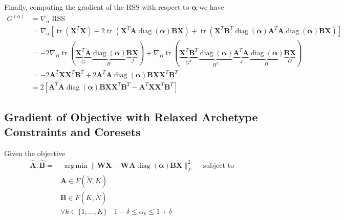 \documentclass[oneside]{article}
\DeclareMathOperator*{\argmin}{arg\,min}
\begin{document}
Finally, computing the gradient of the RSS with respect to $\boldsymbol{\alpha}$ we have
\begin{equation}
    \label{eq:relaxed_objective_grad_alpha}
    \begin{aligned}
        G^{(\alpha)} &= \nabla_{\alpha} \operatorname{RSS} \\
        &= \nabla_{\alpha}
        \left[
            \operatorname{tr}\left( \mathbf{X}^T \mathbf{X} \right)
            - 2 \operatorname{tr} \left( \mathbf{{X}}^T \mathbf{{A}} \operatorname{diag}(\boldsymbol{\alpha}) \mathbf{B} \mathbf{X} \right)
            + \operatorname{tr} \left( \mathbf{X}^T \mathbf{B}^T \operatorname{diag}(\boldsymbol{\alpha}) \mathbf{{A}}^T \mathbf{{A}} \operatorname{diag}(\boldsymbol{\alpha}) \mathbf{B} \mathbf{X} \right)
        \right] \\
        &=
            - 2 \nabla_B \operatorname{tr}(\underbrace{\mathbf{{X}}^T \mathbf{{A}}}_{G} \underbrace{\operatorname{diag}(\boldsymbol{\alpha})}_{H} \underbrace{\mathbf{B} \mathbf{X}}_{J})
            + \nabla_B \operatorname{tr}(\underbrace{\mathbf{X}^T \mathbf{B}^T }_{G^T} \underbrace{\operatorname{diag}(\boldsymbol{\alpha})}_{H^T} \underbrace{\mathbf{{A}}^T \mathbf{{A}}}_{J} \underbrace{\operatorname{diag}(\boldsymbol{\alpha})}_{H} \underbrace{\mathbf{B} \mathbf{X}}_{G}) \\
        & =
            -2 \mathbf{{A}}^T \mathbf{{X}} \mathbf{X}^T \mathbf{B}^T
            +2 \mathbf{{A}}^T \mathbf{{A}} \operatorname{diag}(\boldsymbol{\alpha}) \mathbf{B} \mathbf{X} \mathbf{X}^T \mathbf{B}^T  \\
        & = 2
        \left[
            \mathbf{{A}}^T \mathbf{{A}} \operatorname{diag}(\boldsymbol{\alpha}) \mathbf{B} \mathbf{X} \mathbf{X}^T \mathbf{B}^T
            - \mathbf{{A}}^T \mathbf{{X}} \mathbf{X}^T \mathbf{B}^T
        \right]
    \end{aligned}
\end{equation}

\subsection{Gradient of Objective with Relaxed Archetype Constraints and Coresets}
\label{subsec:relaxed_weighted_objective_grad}

Given the objective
\begin{equation}
\label{eq:relaxed_weighted_objective_}
    \begin{aligned}
        \hat{\mathbf{A}}, \hat{\mathbf{B}} =& \; \underset{}{\argmin}
        \| \mathbf{W} \tilde{\mathbf{X}} -  \mathbf{W} {\mathbf{A}} \operatorname{diag}(\boldsymbol{\alpha}) \mathbf{B} \tilde{\mathbf{X}} \|_F^2 \quad \text{ subject to } \\
        & \mathbf{A} \in F(\tilde{N}, K) \\
        & \mathbf{B} \in F(K, \tilde{N}) \\
        & \forall k \in \{1, ..., K\} \quad 1 - \delta \leq \alpha_k \leq 1 + \delta
    \end{aligned}
\end{equation}
\end{document}
